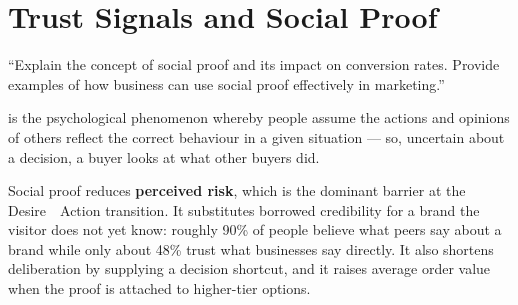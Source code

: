 \documentclass{MMTextbook}
\begin{document}
\section{Trust Signals and Social Proof}

\begin{keybox}
``Explain the concept of social proof and its impact on conversion rates. Provide
examples of how business can use social proof effectively in marketing.''
\end{keybox}

\begin{definitionbox}
 is the psychological phenomenon whereby
people assume the actions and opinions of others reflect the correct behaviour in
a given situation --- so, uncertain about a decision, a buyer looks at what other
buyers did.
\end{definitionbox}

\begin{exambox}
Social proof reduces \textbf{perceived risk}, which is the dominant barrier at the
Desire~\ra~Action transition. It substitutes borrowed credibility for a brand the
visitor does not yet know: roughly 90\% of people believe what peers say about a
brand while only about 48\% trust what businesses say directly. It also shortens
deliberation by supplying a decision shortcut, and it raises average order value
when the proof is attached to higher-tier options.
\end{exambox}
\end{document}
